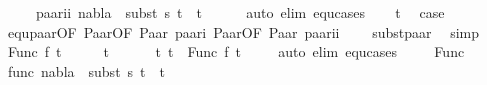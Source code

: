\begin{isabellebody}
\ \ \ \ \ paar{\isacharunderscore}{\kern0pt}ii{\isacharcolon}{\kern0pt}\ {\isachardoublequoteopen}nabla\ {\isasymturnstile}\ subst\ s{}\ t{}{}\ {\isasymapprox}\ t{}{}{\isachardoublequoteclose}\isanewline
\ \ \ \ \isamarkupfalse%
\ {\isacharparenleft}{\kern0pt}auto\ elim{\isacharcolon}{\kern0pt}\ equ{\isachardot}{\kern0pt}cases{\isacharparenright}{\kern0pt}\isanewline
\ \ \isamarkupfalse%
\ t{}\ \isamarkupfalse%
\ {\isacharquery}{\kern0pt}case\isanewline
\ \ \ \ \isamarkupfalse%
\ equ{\isacharunderscore}{\kern0pt}paar{\isacharbrackleft}{\kern0pt}OF\ Paar{\isacharparenleft}{\kern0pt}{}{\isacharparenright}{\kern0pt}{\isacharbrackleft}{\kern0pt}OF\ Paar{\isacharparenleft}{\kern0pt}{}{\isacharparenright}{\kern0pt}\ paar{\isacharunderscore}{\kern0pt}i{\isacharbrackright}{\kern0pt}\ Paar{\isacharparenleft}{\kern0pt}{}{\isacharparenright}{\kern0pt}{\isacharbrackleft}{\kern0pt}OF\ Paar{\isacharparenleft}{\kern0pt}{}{\isacharparenright}{\kern0pt}\ paar{\isacharunderscore}{\kern0pt}ii{\isacharbrackright}{\kern0pt}{\isacharbrackright}{\kern0pt}\isanewline
\ \ \ \ subst{\isacharunderscore}{\kern0pt}paar\ \isamarkupfalse%
\ simp\isanewline
{}\isamarkupfalse%
\isanewline
\ \ \isamarkupfalse%
\ {\isacharparenleft}{\kern0pt}Func\ f\ t{}{\isacharprime}{\kern0pt}{\isacharparenright}{\kern0pt}\isanewline
\ \ \isamarkupfalse%
\ \isamarkupfalse%
\ t{}{\isacharprime}{\kern0pt}\ \isanewline
\ \ \ \ \ t{}{\isacharcolon}{\kern0pt}\ {\isachardoublequoteopen}t{}\ {\isacharequal}{\kern0pt}\ Func\ f\ t{}{\isacharprime}{\kern0pt}{\isachardoublequoteclose}\isanewline
\ \ \ \ \isamarkupfalse%
{\isacharparenleft}{\kern0pt}auto\ elim{\isacharcolon}{\kern0pt}\ equ{\isachardot}{\kern0pt}cases{\isacharparenright}{\kern0pt}\isanewline
\ \ \ \isamarkupfalse%
\ Func{\isacharparenleft}{\kern0pt}{}{\isacharparenright}{\kern0pt}\ \isanewline
\ \ \ \isamarkupfalse%
\ func{\isacharcolon}{\kern0pt}\ {\isachardoublequoteopen}nabla\ {\isasymturnstile}\ subst\ s{}\ t{}{\isacharprime}{\kern0pt}\ {\isasymapprox}\ t{}{\isacharprime}{\kern0pt}{\isachardoublequoteclose}\isanewline
\ \ \ \isamarkupfalse%

\end{isabellebody}

